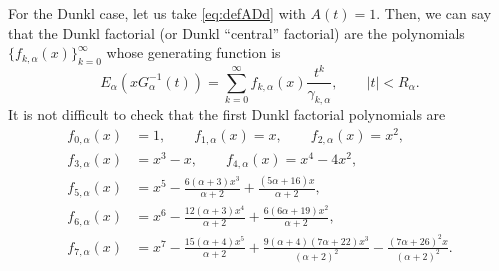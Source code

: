 \documentclass[11pt,a4paper]{article}
\theoremstyle{plain}
\theoremstyle{remark}
\newcommand{\Ea}{E_{\alpha}}
\newcommand{\cc}{\gamma}
\begin{document}
For the Dunkl case, let us take \eqref{eq:defADd} with $A(t)=1$.
Then, we can say that the Dunkl factorial (or Dunkl ``central'' factorial)
are the polynomials  
$\{f_{k,\alpha}(x)\}_{k=0}^{\infty}$ whose generating function is
\begin{equation}
\label{eq:fallfka}
  \Ea(x G_{\alpha}^{-1}(t)) = \sum_{k=0}^{\infty} f_{k,\alpha}(x) \frac{t^k}{\cc_{k,\alpha}},
  \qquad |t|<R_{\alpha}.
\end{equation}
It is not difficult to check that the first Dunkl factorial polynomials are
\begin{align*}
  f_{0,\alpha}(x) &= 1, \qquad
  f_{1,\alpha}(x) = x, \qquad
  f_{2,\alpha}(x) = x^2, \\
  f_{3,\alpha}(x) &= x^3-x, \qquad
  f_{4,\alpha}(x) = x^4 - 4x^2, \\
  f_{5,\alpha}(x) &= x^5
  - \frac{6(\alpha+3) x^3}{\alpha+2}
  + \frac{(5\alpha+16) x}{\alpha+2}, \\
  f_{6,\alpha}(x) &= x^6
  - \frac{12(\alpha+3)x^4}{\alpha+2}
  + \frac{6(6\alpha+19) x^2}{\alpha+2}, \\
  f_{7,\alpha}(x) &= x^7
  - \frac{15(\alpha+4) x^5}{\alpha+2}
  + \frac{9(\alpha+4)(7\alpha+22) x^3}{(\alpha+2)^2}
  - \frac{(7\alpha+26)^2 x}{(\alpha+2)^2}.
\end{align*}
\end{document}
